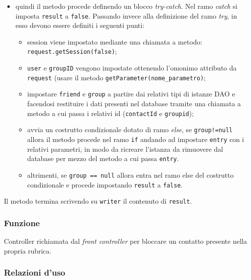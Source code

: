 \begin{description}
\begin{itemize}
		\item quindi il metodo procede definendo un blocco \textit{try-catch}. Nel ramo \textit{catch} si imposta \texttt{result} a \texttt{false}. Passando invece alla definizione del ramo \textit{try}, in esso devono essere definiti i seguenti punti:
		\begin{itemize}
			\item session viene impostato mediante una chiamata a metodo:
			\verb|request.getSession(false)|;
			\item \texttt{user} e \texttt{groupID} vengono impostate ottenendo l'omonimo attributo da \texttt{request} (usare il metodo \texttt{getParameter(nome\_parametro)};
			\item impostare \texttt{friend} e \texttt{group} a partire dai relativi tipi di istanze DAO e facendosi restituire i dati presenti nel database tramite una chiamata a metodo  a cui passa i relativi id (\texttt{contactId} e \texttt{groupid});
			\item avvia un costrutto condizionale dotato di ramo \textit{else}, se \texttt{group!=null} allora il metodo procede nel ramo \texttt{if} andando ad impostare \texttt{entry} con i relativi parametri, in modo da ricreare l'istanza  da rimuovere dal database per mezzo del metodo  a cui passa \texttt{entry}. 
			\item altrimenti, se \texttt{group == null} allora entra nel ramo else del costrutto condizionale e procede impostando \texttt{result} a \texttt{false}.
		\end{itemize}
	\end{itemize}
	Il metodo termina scrivendo su \texttt{writer} il contenuto di \texttt{result}.
	
\end{description}



\subsubsection*{Funzione}
Controller richiamata dal \textit{front controller} per bloccare un contatto presente nella propria rubrica.

\subsubsection*{Relazioni d'uso}

